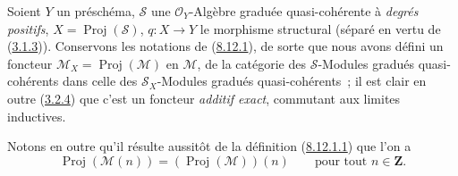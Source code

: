 \begin{env}[8.14.1]
\label{II.8.14.1-fr}
Soient $Y$ un préschéma, $\mathcal{S}$ une $\mathcal{O}_Y$-Algèbre graduée
quasi-cohérente à \emph{degrés positifs},
$X=\operatorname{Proj}(\mathcal{S})$, $q:X\to Y$ le morphisme structural
(séparé en vertu de (\hyperref[II.3.1.3-fr]{3.1.3})). Conservons les
notations de (\hyperref[II.8.12.1-fr]{8.12.1}), de sorte que nous avons
défini un foncteur
$\mathcal{M}_X=\operatorname{Proj}(\mathcal{M})$ en $\mathcal{M}$, de la
catégorie des $\mathcal{S}$-Modules gradués quasi-cohérents dans celle des
$\mathcal{S}_X$-Modules gradués quasi-cohérents~; il est clair en outre
(\hyperref[II.3.2.4-fr]{3.2.4}) que c'est un foncteur \emph{additif exact},
commutant aux limites inductives.

Notons en outre qu'il résulte aussitôt de la définition
(\hyperref[II.8.12.1.1-fr]{8.12.1.1}) que l'on a
\begin{equation}
\label{II.8.14.1.1-fr}
  \operatorname{Proj}(\mathcal{M}(n))
  =(\operatorname{Proj}(\mathcal{M}))(n)
  \qquad\text{pour tout }n\in\mathbf{Z}.
\tag{8.14.1.1}
\end{equation}
\end{env}

